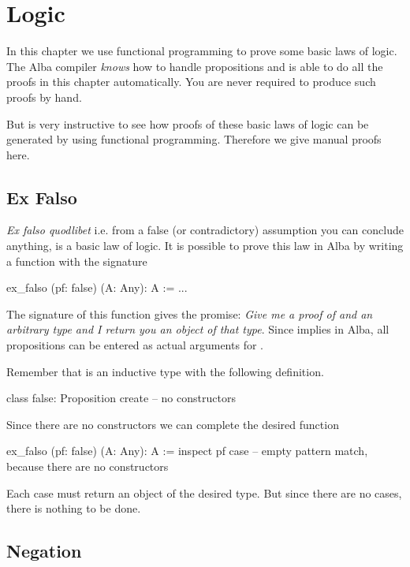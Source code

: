 \newpage
\section{Logic}
\label{sec:certprog-logic}


In this chapter we use functional programming to prove some basic laws of
logic. The Alba compiler \emph{knows} how to handle propositions and is able
to do all the proofs in this chapter automatically. You are never required to
produce such proofs by hand.

But is very instructive to see how proofs of these basic laws of logic can be
generated by using functional programming. Therefore we give manual proofs
here.



\subsection{Ex Falso}

\emph{Ex falso quodlibet} i.e. from a false (or contradictory) assumption you
can conclude anything, is a basic law of logic. It is possible to prove this
law in Alba by writing a function with the signature

\begin{alba}
  ex_falso (pf: false) (A: Any): A :=
    ...
\end{alba}
%
The signature of this function gives the promise: \emph{Give me a proof of
   and an arbitrary type and I return you an object of that
  type}. Since  implies  in Alba, all
propositions can be entered as actual arguments for .


Remember that  is an inductive type with the following definition.
\begin{alba}
  class false: Proposition create
    -- no constructors
\end{alba}
%
Since there are no constructors we can complete the desired function

\begin{alba}
  ex_falso (pf: false) (A: Any): A :=
    inspect pf case
      -- empty pattern match, because there are no constructors
\end{alba}
%
Each case must return an object of the desired type. But since there are no
cases, there is nothing to be done.






\subsection{Negation}

